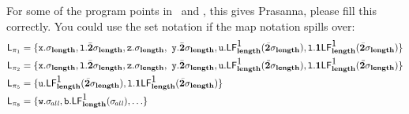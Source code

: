 \documentclass[9pt]{sigplanconf}
\begin{document}
For some of the program points in \length\  and \main,  this gives
{\color {red} Prasanna, please fill this correctly}. You could use the
set notation if the map notation spills over: 
\begin{align*}
\Lan{\pi_1} &= \lbrace  \px.\sigma_{\length}, \xl.\cbar\sigma_{\length}, \pz.\sigma_{\length},\
              \py.\cbar\sigma_{\length}, \pu.\Lf{\length}{\mbox{1}}{\cbar\sigma_{\length}}, \xl.\acdr\Lf{\length}{\mbox{1}}{\cbar\sigma_{\length}} \rbrace \\
\Lan{\pi_2} & =  \lbrace  \px.\sigma_{\length}, \xl.\cbar\sigma_{\length}, \pz.\sigma_{\length},\
                  \py.\cbar\sigma_{\length}, \pu.\Lf{\length}{\mbox{1}}{\cbar\sigma_{\length}}, \xl.\acdr\Lf{\length}{\mbox{1}}{\cbar\sigma_{\length}} \rbrace \\
\Lan{\pi_5} &= \lbrace \pu.\Lf{\length}{\mbox{1}}{\cbar\sigma_{\length}}, \xl.\acdr\Lf{\length}{\mbox{1}}{\cbar\sigma_{\length}}\rbrace \\
\Lan{\pi_8} &= \lbrace \pw.\sigma_{\mathit{\!all}}, \pb.\Lf{\length}{\mbox{1}}{\sigma_{\mathit{\!all}}}, \ldots  \rbrace 
\end{align*}
\end{document}
